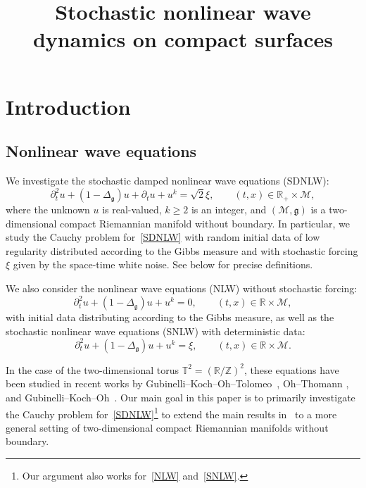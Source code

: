 \documentclass[AHL,Unicode,longabstracts,published]{cedram}
\title[Stochastic NLW dynamics on surfaces]{Stochastic nonlinear wave dynamics on compact surfaces}
\author[\initial{T.} \lastname{Oh}]{\firstname{Tadahiro} \lastname{Oh}}
\author[\initial{T.} \lastname{Robert}]{\firstname{Tristan} \lastname{Robert}}
\author[\initial{N.} \lastname{Tzvetkov}]{\firstname{Nikolay} \lastname{Tzvetkov}}
\newcommand{\Z}{\mathbb{Z}}
\newcommand{\R}{\mathbb{R}}
\newcommand{\T}{\mathbb{T}}
\newcommand{\M}{\mathcal{M}}
\newcommand{\g}{\mathfrak{g}}
\newcommand{\Dlg}{\Delta_{\g}}
\newcommand{\dt}{\partial_t}
\begin{document}
\maketitle

\section{Introduction}

\subsection{Nonlinear wave equations}
We investigate the stochastic damped nonlinear wave equations (SDNLW):
\begin{equation}\label{SDNLW}
\dt^2 u + (1 - \Dlg) u + \dt u + u^k = \sqrt{2}\xi,
\qquad (t,x) \in \R_+ \times \M,
\end{equation}
where the unknown $u$ is real-valued, $k \geq 2$ is an integer, and $(\M,\g)$ is a two-dimensional compact Riemannian manifold without boundary. In particular, we study the Cauchy problem for~\eqref{SDNLW} with random initial data of low regularity distributed according to the Gibbs measure and with stochastic forcing $\xi$ given by the space-time white noise. See below for precise definitions.

We also consider the nonlinear wave equations (NLW) without stochastic forcing:
\begin{equation}\label{NLW}
\dt^2 u + (1 - \Dlg) u + u^k = 0,
\qquad (t,x) \in \R \times \M,
\end{equation}
with initial data distributing according to the Gibbs measure, as well as the stochastic nonlinear wave equations (SNLW) with deterministic data:
\begin{equation}\label{SNLW}
\dt^2 u + (1 - \Dlg) u + u^k = \xi,
\qquad (t,x) \in \R \times \M.
\end{equation}

In the case of the two-dimensional torus $\T^2 = (\R/\Z)^2$, these equations have been studied in recent works by Gubinelli--Koch--Oh--Tolomeo~\cite{GKOT}, Oh--Thomann \cite{OT2}, and Gubinelli--Koch--Oh~\cite{GKO}. Our main goal in this paper is to primarily investigate the Cauchy problem for~\eqref{SDNLW}\footnote{Our argument also works for~\eqref{NLW} and~\eqref{SNLW}.} to extend the main results in~\cite{GKOT, OT2, GKO} to a more general setting of two-dimensional compact Riemannian manifolds without boundary.
\end{document}
